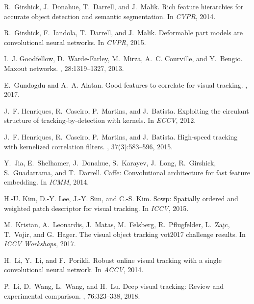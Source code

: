 \documentclass[10pt,twocolumn,letterpaper]{article}
\begin{document}
{\begin{thebibliography}{10}
R.~Girshick, J.~Donahue, T.~Darrell, and J.~Malik.
\newblock Rich feature hierarchies for accurate object detection and semantic
  segmentation.
\newblock In {\em CVPR}, 2014.

R.~Girshick, F.~Iandola, T.~Darrell, and J.~Malik.
\newblock Deformable part models are convolutional neural networks.
\newblock In {\em CVPR}, 2015.

I.~J. Goodfellow, D.~Warde-Farley, M.~Mirza, A.~C. Courville, and Y.~Bengio.
\newblock Maxout networks.
, 28:1319--1327, 2013.

E.~Gundogdu and A.~A. Alatan.
\newblock Good features to correlate for visual tracking.
, 2017.

J.~F. Henriques, R.~Caseiro, P.~Martins, and J.~Batista.
\newblock Exploiting the circulant structure of tracking-by-detection with
  kernels.
\newblock In {\em ECCV}, 2012.

J.~F. Henriques, R.~Caseiro, P.~Martins, and J.~Batista.
\newblock High-speed tracking with kernelized correlation filters.
,
  37(3):583--596, 2015.

Y.~Jia, E.~Shelhamer, J.~Donahue, S.~Karayev, J.~Long, R.~Girshick,
  S.~Guadarrama, and T.~Darrell.
\newblock Caffe: Convolutional architecture for fast feature embedding.
\newblock In {\em ICMM}, 2014.

H.-U. Kim, D.-Y. Lee, J.-Y. Sim, and C.-S. Kim.
\newblock Sowp: Spatially ordered and weighted patch descriptor for visual
  tracking.
\newblock In {\em ICCV}, 2015.

M.~Kristan, A.~Leonardis, J.~Matas, M.~Felsberg, R.~Pflugfelder, L.~Zajc,
  T.~Vojir, and G.~Hager.
\newblock The visual object tracking vot2017 challenge results.
\newblock In {\em ICCV Workshops}, 2017.

H.~Li, Y.~Li, and F.~Porikli.
\newblock Robust online visual tracking with a single convolutional neural
  network.
\newblock In {\em ACCV}, 2014.

P.~Li, D.~Wang, L.~Wang, and H.~Lu.
\newblock Deep visual tracking: Review and experimental comparison.
, 76:323--338, 2018.


\end{thebibliography}}
\end{document}
